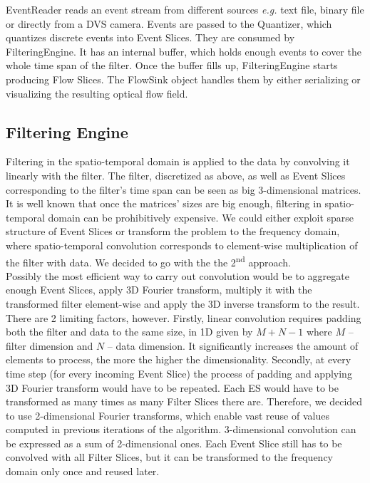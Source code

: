 EventReader reads an event stream from different sources \emph{e.g.} text file, binary file or directly from a DVS camera.
Events are passed to the Quantizer, which quantizes discrete events into Event Slices.
They are consumed by FilteringEngine. It has an internal buffer, which holds enough events to cover the whole time span of the filter. 
Once the buffer fills up, FilteringEngine starts producing Flow Slices.
The FlowSink object handles them by either serializing or visualizing the resulting optical flow field.

\subsection{Filtering Engine}

Filtering in the spatio-temporal domain is applied to the data by convolving it linearly with the filter.
The filter, discretized as above, as well as Event Slices corresponding to the filter's time span can be seen as big 3-dimensional matrices.
It is well known that once the matrices' sizes are big enough, filtering in spatio-temporal domain can be prohibitively expensive.
We could either exploit sparse structure of Event Slices or transform the problem to the frequency domain, where spatio-temporal convolution corresponds to element-wise multiplication of the filter with data.
We decided to go with the the 2\textsuperscript{nd} approach.
\\

Possibly the most efficient way to carry out convolution would be to aggregate enough Event Slices, apply 3D Fourier transform, multiply it with the transformed filter element-wise and apply the 3D inverse transform to the result.
There are 2 limiting factors, however.
Firstly, linear convolution requires padding both the filter and data to the same size, in 1D given by $M+N-1$ where $M$ -- filter dimension and $N$ -- data dimension.
It significantly increases the amount of elements to process, the more the higher the dimensionality.
Secondly, at every time step (for every incoming Event Slice) the process of padding and applying 3D Fourier transform would have to be repeated.
Each ES would have to be transformed as many times as many Filter Slices there are.
Therefore, we decided to use 2-dimensional Fourier transforms, which enable vast reuse of values computed in previous iterations of the algorithm.
3-dimensional convolution can be expressed as a sum of 2-dimensional ones.
Each Event Slice still has to be convolved with all Filter Slices, but it can be transformed to the frequency domain only once and reused later.

